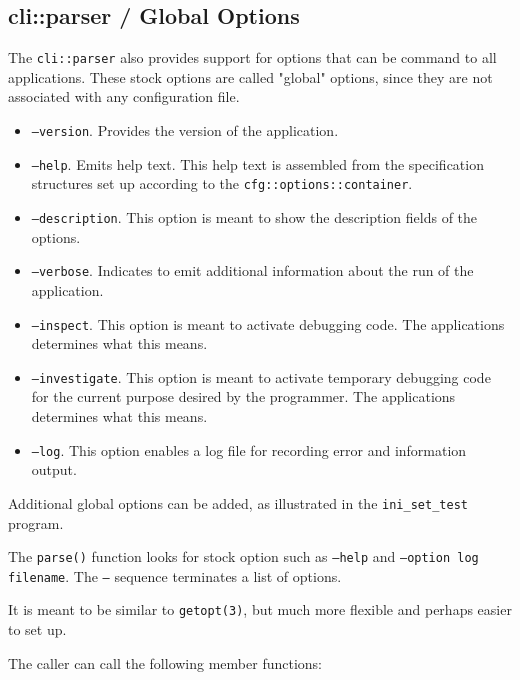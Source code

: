 \subsection{cli::parser / Global Options}
\label{subsec:cli_namespace_parser_global_options}

   The \texttt{cli::parser} also provides support for options that can
   be command to all applications. These stock options are called
   "global" options, since they are not associated with any configuration
   file.

   \begin{itemize}
      \item \texttt{--version}.
         Provides the version of the application.
      \item \texttt{--help}.
         Emits help text. This help text is assembled from
         the specification structures set up according to the
         \texttt{cfg::options::container}.
      \item \texttt{--description}.
         This option is meant to show the description fields of the
         options.
      \item \texttt{--verbose}.
         Indicates to emit additional information about the run of the
         application.
      \item \texttt{--inspect}.
         This option is meant to activate debugging code.
         The applications determines what this means.
      \item \texttt{--investigate}.
         This option is meant to activate temporary debugging code for
         the current purpose desired by the programmer.
         The applications determines what this means.
      \item \texttt{--log}.
         This option enables a log file for recording error and information
         output.
   \end{itemize}

   Additional global options can be added, as illustrated in the
   \texttt{ini\_set\_test} program.

   The \texttt{parse()} function looks for stock option such as
   \texttt{--help} and \texttt{--option log filename}.
   The \texttt{--} sequence terminates a list of options.

   It is meant to be similar to \texttt{getopt(3)}, but much more flexible and
   perhaps easier to set up.

   The caller can call the following member functions:

